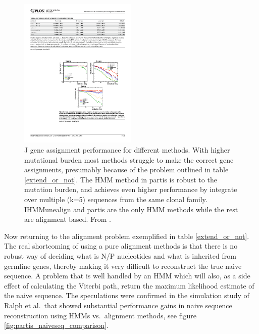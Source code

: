 \begin{figure}
    \centering
    \includegraphics[width=0.5\textwidth]{figures/partis_Jgene_comparison.pdf}
    \caption{
        \label{fig:partis_Jgene_comparison}
        J gene assignment performance for different methods.
        With higher mutational burden most methods struggle to make the correct gene assignments, presumably because of the problem outlined in table \ref{extend_or_not}.
        The HMM method in partis is robust to the mutation burden, and achieves even higher performance by integrate over multiple (k=5) sequences from the same clonal family.
        IHMMunealign and partis are the only HMM methods while the rest are alignment based.
        From \cite{ralph2016consistency}.
    }
\end{figure}


Now returning to the alignment problem exemplified in table \ref{extend_or_not}.
The real shortcoming of using a pure alignment methods is that there is no robust way of deciding what is N/P nucleotides and what is inherited from germline genes, thereby making it very difficult to reconstruct the true naive sequence.
A problem that is well handled by an HMM which will also, as a side effect of calculating the Viterbi path, return the maximum likelihood estimate of the naive sequence.
The speculations were confirmed in the simulation study of Ralph et al.\ that showed substantial performance gains in naive sequence reconstruction using HMMs vs.\ alignment methods, see figure \ref{fig:partis_naiveseq_comparison}.

